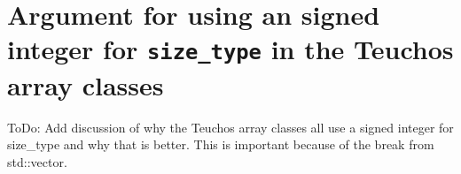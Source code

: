 \documentclass[pdf,ps2pdf,11pt]{SANDreport}
\begin{document}
%
{}\section{Argument for using an signed integer for
{}\texttt{size\_type} in the Teuchos array classes}
\label{sec:unsigned_size_type}
%

ToDo: Add discussion of why the Teuchos array classes all use a signed
integer for size\_type and why that is better.  This is important
because of the break from std::vector.




\begin{SANDdistribution}[NM]
\end{SANDdistribution}
\end{document}
